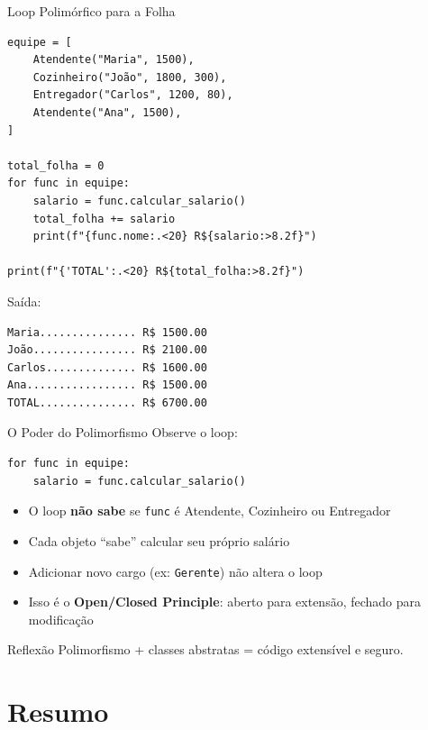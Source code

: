 \documentclass[aspectratio=169]{beamer}
\begin{document}
\begin{frame}[fragile]{Loop Polimórfico para a Folha}
  \begin{lstlisting}
equipe = [
    Atendente("Maria", 1500),
    Cozinheiro("João", 1800, 300),
    Entregador("Carlos", 1200, 80),
    Atendente("Ana", 1500),
]

total_folha = 0
for func in equipe:
    salario = func.calcular_salario()
    total_folha += salario
    print(f"{func.nome:.<20} R${salario:>8.2f}")

print(f"{'TOTAL':.<20} R${total_folha:>8.2f}")
  \end{lstlisting}

  Saída:
  \begin{lstlisting}[numbers=none]
Maria............... R$ 1500.00
João................ R$ 2100.00
Carlos.............. R$ 1600.00
Ana................. R$ 1500.00
TOTAL............... R$ 6700.00
  \end{lstlisting}
\end{frame}

\begin{frame}[fragile]{O Poder do Polimorfismo}
  Observe o loop:

  \begin{lstlisting}
for func in equipe:
    salario = func.calcular_salario()
  \end{lstlisting}

  \bigskip

  \begin{itemize}
    \item O loop \textbf{não sabe} se \texttt{func} é Atendente, Cozinheiro ou Entregador
    \item Cada objeto ``sabe'' calcular seu próprio salário
    \item Adicionar novo cargo (ex: \texttt{Gerente}) não altera o loop
    \item Isso é o \textbf{Open/Closed Principle}: aberto para extensão, fechado para modificação
  \end{itemize}

  \begin{exampleblock}{Reflexão}
    Polimorfismo + classes abstratas = código extensível e seguro.
  \end{exampleblock}
\end{frame}

\section{Resumo}
\end{document}
